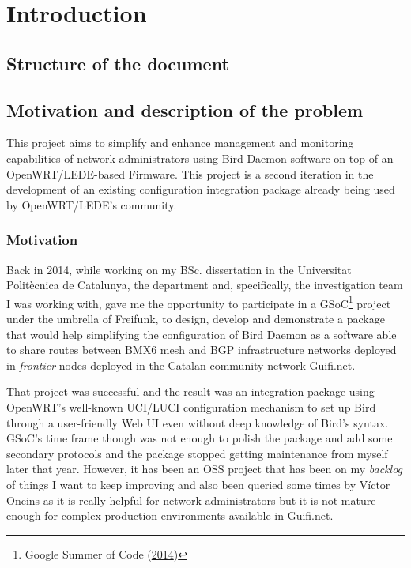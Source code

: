 \chapter{Introduction}
\label{ch:introduction}
\pagestyle{headings}

\section{Structure of the document}

\section{Motivation and description of the problem}
\label{sec:bdotp}
This project aims to simplify and enhance management and monitoring capabilities of network administrators using Bird Daemon  software on top of an OpenWRT/LEDE-based Firmware. This project is a second iteration in the development of an existing configuration integration package already being used by OpenWRT/LEDE's community.

\subsection{Motivation}
\label{sec:motivation}
Back in 2014, while working on my BSc. dissertation in the Universitat Politècnica de Catalunya, the department and, specifically, the investigation team I was working with, gave me the opportunity to participate in a GSoC\footnote{Google Summer of Code (\href{https://www.google-melange.com/archive/gsoc/2014/orgs/freifunk/projects/eloicaso.html}{2014})} project under the umbrella of Freifunk, to design, develop and demonstrate a package that would help simplifying the configuration of Bird Daemon as a software able to share routes between BMX6 mesh and BGP infrastructure networks deployed in \textit{frontier} nodes deployed in the Catalan community network Guifi.net.

That project was successful and the result was an integration package using OpenWRT's well-known UCI/LUCI configuration mechanism to set up Bird through a user-friendly Web UI even without deep knowledge of Bird's syntax. GSoC's time frame though was not enough to polish the package and add some secondary protocols and the package stopped getting maintenance from myself later that year. However, it has been an OSS project that has been on my \textit{backlog} of things I want to keep improving and also been queried some times by Víctor Oncins as it is really helpful for network administrators but it is not mature enough for complex production environments available in Guifi.net.

